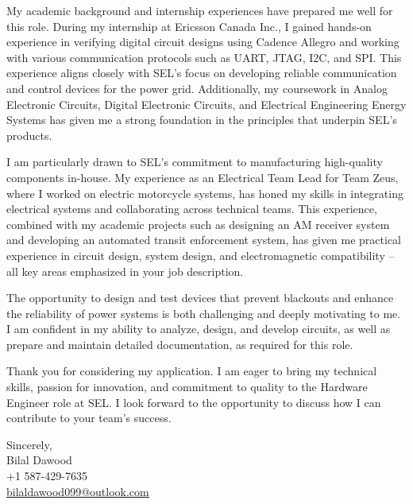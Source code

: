 \documentclass[11pt,a4]{article}
\begin{document}
My academic background and internship experiences have prepared me well for this role. During my internship at Ericsson Canada Inc., I gained hands-on experience in verifying digital circuit designs using Cadence Allegro and working with various communication protocols such as UART, JTAG, I2C, and SPI. This experience aligns closely with SEL's focus on developing reliable communication and control devices for the power grid. Additionally, my coursework in Analog Electronic Circuits, Digital Electronic Circuits, and Electrical Engineering Energy Systems has given me a strong foundation in the principles that underpin SEL's products.

I am particularly drawn to SEL's commitment to manufacturing high-quality components in-house. My experience as an Electrical Team Lead for Team Zeus, where I worked on electric motorcycle systems, has honed my skills in integrating electrical systems and collaborating across technical teams. This experience, combined with my academic projects such as designing an AM receiver system and developing an automated transit enforcement system, has given me practical experience in circuit design, system design, and electromagnetic compatibility – all key areas emphasized in your job description.

The opportunity to design and test devices that prevent blackouts and enhance the reliability of power systems is both challenging and deeply motivating to me. I am confident in my ability to analyze, design, and develop circuits, as well as prepare and maintain detailed documentation, as required for this role.

Thank you for considering my application. I am eager to bring my technical skills, passion for innovation, and commitment to quality to the Hardware Engineer role at SEL. I look forward to the opportunity to discuss how I can contribute to your team's success.


\vspace{0.5cm}
\raggedright
Sincerely, \\ Bilal Dawood \\ +1 587-429-7635 \\ \href{mailto:bilaldawood099@outlook.com}{\underline{bilaldawood099@outlook.com}}
\end{document}
